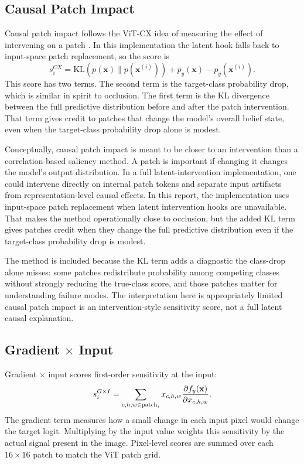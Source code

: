 \documentclass[10pt]{article}
\begin{document}
\subsection{Causal Patch Impact}
Causal patch impact follows the ViT-CX idea of measuring the effect of intervening on a patch \cite{xie2023vitcx}. In this implementation the latent hook falls back to input-space patch replacement, so the score is
\[
s_i^{CX}=\mathrm{KL}(p(\mathbf{x})\|p(\mathbf{x}^{(i)}))+
p_y(\mathbf{x})-p_y(\mathbf{x}^{(i)}).
\]
This score has two terms. The second term is the target-class probability drop, which is similar in spirit to occlusion. The first term is the KL divergence between the full predictive distribution before and after the patch intervention. That term gives credit to patches that change the model's overall belief state, even when the target-class probability drop alone is modest.

Conceptually, causal patch impact is meant to be closer to an intervention than a correlation-based saliency method. A patch is important if changing it changes the model's output distribution. In a full latent-intervention implementation, one could intervene directly on internal patch tokens and separate input artifacts from representation-level causal effects. In this report, the implementation uses input-space patch replacement when latent intervention hooks are unavailable. That makes the method operationally close to occlusion, but the added KL term gives patches credit when they change the full predictive distribution even if the target-class probability drop is modest.

The method is included because the KL term adds a diagnostic the class-drop alone misses: some patches redistribute probability among competing classes without strongly reducing the true-class score, and those patches matter for understanding failure modes. The interpretation here is appropriately limited causal patch impact is an intervention-style sensitivity score, not a full latent causal explanation.

\subsection{Gradient $\times$ Input}
Gradient $\times$ input scores first-order sensitivity at the input:
\[
s_i^{G\times I}=
\sum_{c,h,w\in \mathrm{patch}_i}x_{c,h,w}
{\partial f_y(\mathbf{x})\over\partial x_{c,h,w}}.
\]
The gradient term measures how a small change in each input pixel would change the target logit. Multiplying by the input value weights this sensitivity by the actual signal present in the image. Pixel-level scores are summed over each $16\times16$ patch to match the ViT patch grid.
\end{document}
